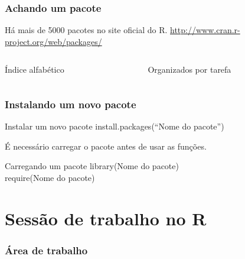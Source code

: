 \documentclass{beamer}
\begin{document}
  \begin{frame}
    \frametitle{Achando um pacote}
    \begin{center}
      Há mais de 5000 pacotes no site oficial do R.
\vspace{10pt}
\url{http://www.cran.r-project.org/web/packages/}  
    
      \begin{columns}
        \begin{column}{6cm}
          \begin{center}
           Índice alfabético

          \end{center}

        \end{column}
        \begin{column}{6cm}
          \begin{center}
           Organizados por tarefa

          
          \end{center}
        \end{column}
      \end{columns}

\end{center} 
  \end{frame}
  \begin{frame}
    \frametitle{Instalando um novo pacote}
    \begin{block}{Instalar um novo pacote}
       install.packages(``Nome do pacote'')
    \end{block}
   É necessário carregar o pacote antes de usar as funções.
   \begin{block}{Carregando um pacote}
     library(Nome do pacote)\\
     require(Nome do pacote)

   \end{block}
  \end{frame}
\section{Sessão de trabalho no R}
\begin{frame}
  \frametitle{Área de trabalho}
  \begin{center}
  \end{center}
\end{frame}
\end{document}
